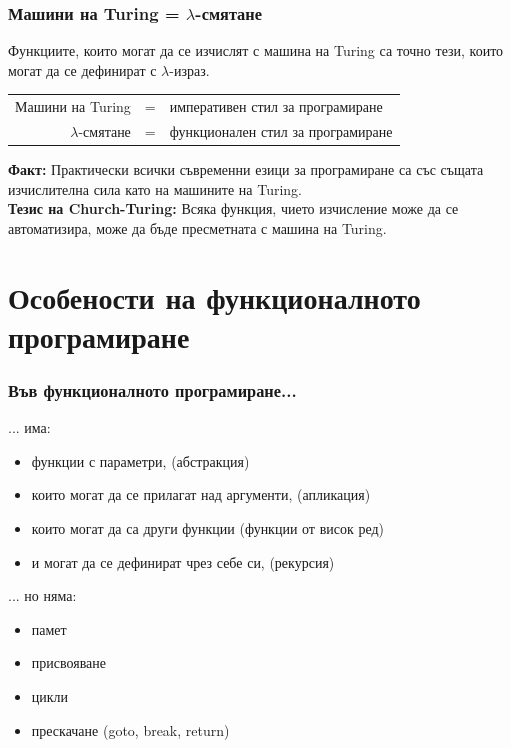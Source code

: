 \documentclass[alsotrans,beameroptions={aspectratio=169}]{beamerswitch}
\begin{document}
\begin{frame}
  \frametitle{Машини на Turing = $\lambda$-смятане}

  \begin{theorem}
  Функциите, които могат да се изчислят с машина на Turing са точно тези, които могат да се дефинират с $\lambda$-израз.
  \end{theorem}
  \pause
  \begin{center}
    \begin{tabular}{|rcl|}
      \hline
      Машини на Turing & = & императивен стил за програмиране\\
      $\lambda$-смятане & = & функционален стил за програмиране\\
      \hline
    \end{tabular}
  \end{center}
  \pause
  \textbf{Факт: }Практически всички съвременни езици за програмиране са със същата изчислителна сила като на машините на Turing.\\[2ex]
  \pause
  \textbf{Тезис на Church-Turing:} Всяка функция, чието изчисление може да се автоматизира, може да бъде пресметната с машина на Turing.
\end{frame}

\section*{Особености на функционалното програмиране}

\begin{frame}
  \frametitle{Във функционалното програмиране...}

  ... има:
  \begin{itemize}[<+->]
  \item функции с параметри, (абстракция)
  \item които могат да се прилагат над аргументи, (апликация)
  \item които могат да са други функции (функции от висок ред)
  \item и могат да се дефинират чрез себе си, (рекурсия)
  \end{itemize}
  \onslide<+->
  ... но няма:
  \begin{itemize}[<+->]
  \item памет
  \item присвояване
  \item цикли
  \item прескачане (goto, break, return)
  \end{itemize}
\end{frame}
\end{document}
